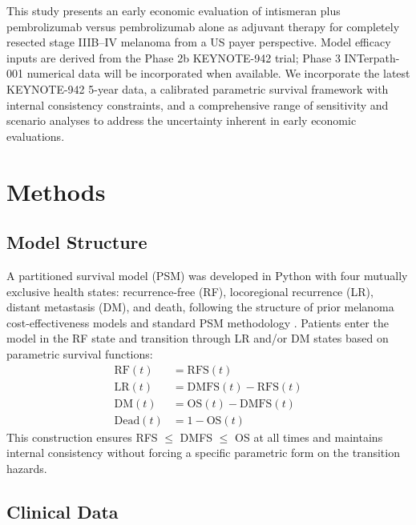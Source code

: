 \documentclass[12pt,a4paper]{article}
\begin{document}
This study presents an early economic evaluation of intismeran plus \mbox{pembrolizumab} versus \mbox{pembrolizumab} alone as adjuvant therapy for completely resected stage IIIB--IV melanoma from a US payer perspective. Model efficacy inputs are derived from the Phase 2b \mbox{KEYNOTE-942} trial; Phase 3 \mbox{INTerpath-001} numerical data will be incorporated when available. We incorporate the latest \mbox{KEYNOTE-942} 5-year data, a calibrated parametric survival framework with internal consistency constraints, and a comprehensive range of sensitivity and scenario analyses to address the uncertainty inherent in early economic evaluations.

\section{Methods}

\subsection{Model Structure}

A partitioned survival model (PSM) was developed in Python with four mutually exclusive health states: recurrence-free (RF), locoregional recurrence (LR), distant metastasis (DM), and death, following the structure of prior melanoma cost-effectiveness models and standard PSM methodology \cite{woods2017,zhang2023,bensimon2019,gye2024}. Patients enter the model in the RF state and transition through LR and/or DM states based on parametric survival functions:
\begin{align*}
\text{RF}(t) &= \text{RFS}(t) \\
\text{LR}(t) &= \text{DMFS}(t) - \text{RFS}(t) \\
\text{DM}(t) &= \text{OS}(t) - \text{DMFS}(t) \\
\text{Dead}(t) &= 1 - \text{OS}(t)
\end{align*}
This construction ensures RFS $\leq$ DMFS $\leq$ OS at all times and maintains internal consistency without forcing a specific parametric form on the transition hazards.

\subsection{Clinical Data}
\end{document}
